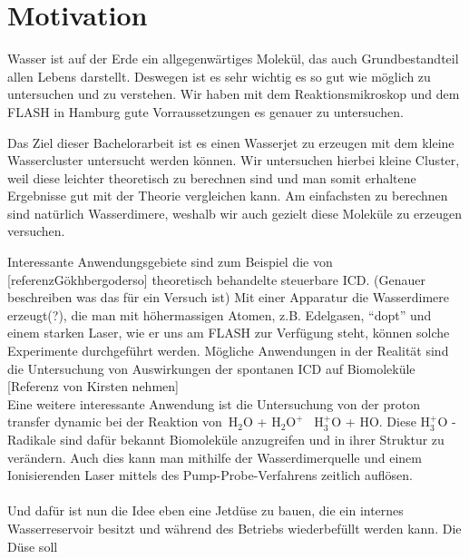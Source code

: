 
  \chapter{Motivation} 
  
  Wasser ist auf der Erde ein allgegenwärtiges Molekül, das auch Grundbestandteil allen Lebens darstellt. Deswegen ist es sehr wichtig es so gut wie möglich zu untersuchen und zu verstehen. Wir haben mit dem Reaktionsmikroskop und dem FLASH in Hamburg gute Vorraussetzungen es genauer zu untersuchen.
  
  Das Ziel dieser Bachelorarbeit ist es einen Wasserjet zu erzeugen mit dem kleine Wassercluster untersucht werden können. Wir untersuchen hierbei kleine Cluster, weil diese leichter theoretisch zu berechnen sind und man somit erhaltene Ergebnisse gut mit der Theorie vergleichen kann. Am einfachsten zu berechnen sind natürlich Wasserdimere, weshalb wir auch gezielt diese Moleküle zu erzeugen versuchen.
  
  Interessante Anwendungsgebiete sind zum Beispiel die von [referenzGökhbergoderso] theoretisch behandelte steuerbare ICD. (Genauer beschreiben was das für ein Versuch ist) Mit einer Apparatur die Wasserdimere erzeugt(?), die man mit höhermassigen Atomen, z.B. Edelgasen, \enquote{dopt} und einem starken Laser, wie er uns am FLASH zur Verfügung steht, können solche Experimente durchgeführt werden. Mögliche Anwendungen in der Realität sind die Untersuchung von Auswirkungen der spontanen ICD auf Biomoleküle [Referenz von Kirsten nehmen]\\
  Eine weitere interessante Anwendung ist die Untersuchung von der proton transfer dynamic bei der Reaktion von\  $\mathrm{H}_2\mathrm{O}$ +  $\mathrm{H}_2\mathrm{O}^{+}$ \textrightarrow\ $\mathrm{H}_3^{+}\mathrm{O}$ + $\mathrm{H}\mathrm{O}$. Diese $\mathrm{H}_3^{+}\mathrm{O}$ - Radikale sind dafür bekannt Biomoleküle anzugreifen und in ihrer Struktur zu verändern. Auch dies kann man mithilfe der Wasserdimerquelle und einem Ionisierenden Laser mittels des Pump-Probe-Verfahrens zeitlich auflösen.\\
  \\
  Und dafür ist nun die Idee eben eine Jetdüse zu bauen, die ein internes Wasserreservoir besitzt und während des Betriebs wiederbefüllt werden kann. Die Düse soll 
  
